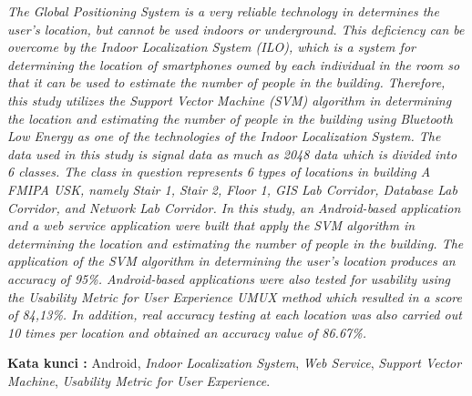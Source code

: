 \begin{abstracteng}

    \textit{The Global Positioning System is a very reliable technology in determines the user's location, but cannot be used indoors or underground. This deficiency can be overcome by the Indoor Localization System (ILO), which is a system for determining the location of smartphones owned by each individual in the room so that it can be used to estimate the number of people in the building. Therefore, this study utilizes the Support Vector Machine (SVM) algorithm in determining the location and estimating the number of people in the building using Bluetooth Low Energy as one of the technologies of the Indoor Localization System. The data used in this study is signal data as much as 2048 data which is divided into 6 classes. The class in question represents 6 types of locations in building A FMIPA USK, namely Stair 1, Stair 2, Floor 1, GIS Lab Corridor, Database Lab Corridor, and Network Lab Corridor. In this study, an Android-based application and a web service application were built that apply the SVM algorithm in determining the location and estimating the number of people in the building. The application of the SVM algorithm in determining the user's location produces an accuracy of 95\%. Android-based applications were also tested for usability using the Usability Metric for User Experience UMUX method which resulted in a score of 84,13\%. In addition, real accuracy testing at each location was also carried out 10 times per location and obtained an accuracy value of 86.67\%.}


    \bigskip
    \noindent
    \textbf{Kata kunci :} Android, \textit{Indoor Localization System}, \textit{Web Service}, \textit{Support Vector Machine}, \textit{Usability Metric for User Experience}.
\end{abstracteng}